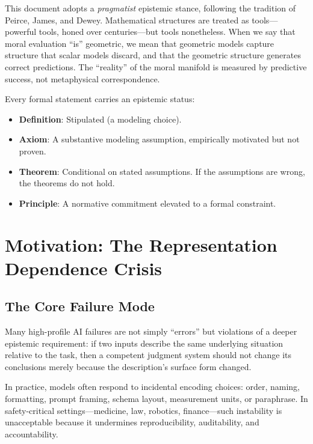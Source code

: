 \documentclass[12pt,letterpaper]{article}
\theoremstyle{definition}
\theoremstyle{plain}
\begin{document}
This document adopts a \emph{pragmatist} epistemic stance, following the tradition of Peirce, James, and Dewey. Mathematical structures are treated as tools---powerful tools, honed over centuries---but tools nonetheless. When we say that moral evaluation ``is'' geometric, we mean that geometric models capture structure that scalar models discard, and that the geometric structure generates correct predictions. The ``reality'' of the moral manifold is measured by predictive success, not metaphysical correspondence.

Every formal statement carries an epistemic status:
\begin{itemize}
    \item \textbf{Definition}: Stipulated (a modeling choice).
    \item \textbf{Axiom}: A substantive modeling assumption, empirically motivated but not proven.
    \item \textbf{Theorem}: Conditional on stated assumptions. If the assumptions are wrong, the theorems do not hold.
    \item \textbf{Principle}: A normative commitment elevated to a formal constraint.
\end{itemize}


\section{Motivation: The Representation Dependence Crisis}
\label{sec:motivation}

\subsection{The Core Failure Mode}

Many high-profile AI failures are not simply ``errors'' but violations of a deeper epistemic requirement: if two inputs describe the same underlying situation relative to the task, then a competent judgment system should not change its conclusions merely because the description's surface form changed.

In practice, models often respond to incidental encoding choices: order, naming, formatting, prompt framing, schema layout, measurement units, or paraphrase. In safety-critical settings---medicine, law, robotics, finance---such instability is unacceptable because it undermines reproducibility, auditability, and accountability.
\end{document}
